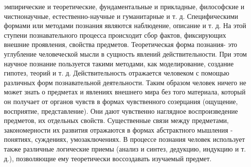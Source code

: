\documentclass[12pt]{article}
\begin{document}
эмпирические и теоретические, фундаментальные и прикладные, философские и чистнонаучные, естественно-научные и гуманитарные и т. д.
Специфическими формами или методами познания являются наблюдение, описание и т. д. На этой ступени
познавательного процесса происходит сбор фактов, фиксирующих внешние проявления, свойства предметов.
Теоретическая форма познания- это углубление человеческой мысли в сущность явлений действительности.
При этом научное познание пользуется такими методами, как моделирование, создание гипотез, теорий и т. д.
Действительность отражается человеком с помощью различных форм познавательной деятельности.
Таким образом человек ничего не может знать о предметах и явлениях внешнего мира без того материала,
который  он  получает  от  органов  чувств  в  формах  чувственного  созерцания  (ощущение,  восприятие,
представление).  Они  дают  чувственно  наглядное  воспроизведение  предметов,  их  отдельных  свойств.
Существенные  связи  между  предметами,  закономерности  их  развития  отражаются  в  формах  абстрактного
мышления - понятиях, суждениях, умозаключениях. В процессе познания человек использует также различные
логические приемы (анализ и синтез, дедукцию, индукцию и т. д.), позволяющие ему теоретически воссоздавать
изучаемый предмет.

\newpage
\end{document}
